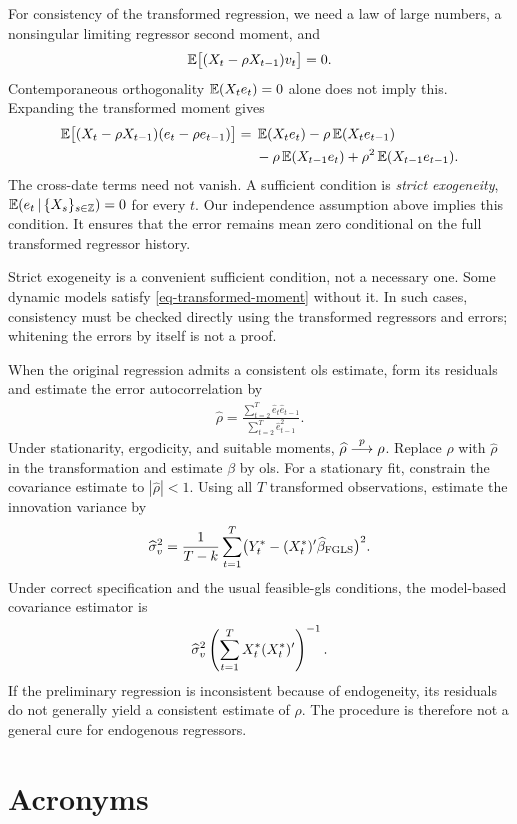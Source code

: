 \documentclass[a4paper,12pt]{article}
\begin{document}
\begin{remark}
	For consistency of the transformed regression, we need a law of large numbers,
	a nonsingular limiting regressor second moment, and
	\begin{align}\label{eq-transformed-moment}
		\operatorname{\mathbb{E}}\bigl[(X_t-\rho X_{t-1})v_t\bigr]=0.
	\end{align}
	Contemporaneous orthogonality $\operatorname{\mathbb{E}}(X_te_t)=0$ alone does not imply this.
	Expanding the transformed moment gives
	\begin{align}
		\operatorname{\mathbb{E}}\bigl[(X_t-\rho X_{t-1})(e_t-\rho e_{t-1})\bigr]
		={}&\operatorname{\mathbb{E}}(X_te_t)-\rho\operatorname{\mathbb{E}}(X_te_{t-1})\\
		&-\rho\operatorname{\mathbb{E}}(X_{t-1}e_t)+\rho^2\operatorname{\mathbb{E}}(X_{t-1}e_{t-1}).
	\end{align}
	The cross-date terms need not vanish.
	A sufficient condition is \emph{strict exogeneity},
	$\operatorname{\mathbb{E}}(e_t\mathpunct{}|\mathpunct{}\{X_s\}_{s\in\mathbb Z})=0$ for every $t$.
	Our independence assumption above implies this condition.
	It ensures that the error remains mean zero conditional on the full transformed regressor history.
\end{remark}

\begin{remark}
    Strict exogeneity is a convenient sufficient condition, not a necessary one.
    Some dynamic models satisfy \eqref{eq-transformed-moment} without it.
    In such cases, consistency must be checked directly using the transformed regressors and errors;
    whitening the errors by itself is not a proof.
\end{remark}

\begin{remark}
	When the original regression admits a consistent \gls{ols} estimate, form its residuals
	and estimate the error autocorrelation by
	\begin{align}
		\widehat\rho
		=\frac{\sum_{t=2}^T\widehat e_t\widehat e_{t-1}}
		{\sum_{t=2}^T\widehat e_{t-1}^2}.
	\end{align}
	Under stationarity, ergodicity, and suitable moments, $\widehat\rho\overset{p}{\longrightarrow}\rho$.
	Replace $\rho$ with $\widehat\rho$ in the transformation and estimate $\beta$ by \gls{ols}.
	For a stationary fit, constrain the covariance estimate to $|\widehat\rho|<1$.
	Using all $T$ transformed observations, estimate the innovation variance by
	\begin{align}
		\widehat\sigma_v^2
		=\frac{1}{T-k}\sum_{t=1}^T
		\bigl(Y_t^*-(X_t^*)^{\prime}\widehat\beta_{\mathrm{FGLS}}\bigr)^2.
	\end{align}
	Under correct specification and the usual feasible-\gls{gls} conditions,
	the model-based covariance estimator is
	\begin{align}
		\widehat\sigma_v^2
		\left(\sum_{t=1}^T X_t^*(X_t^*)^{\prime}\right)^{-1}.
	\end{align}
	If the preliminary regression is inconsistent because of endogeneity,
	its residuals do not generally yield a consistent estimate of $\rho$.
	The procedure is therefore not a general cure for endogenous regressors.
\end{remark}

\vfill
\section*{Acronyms}
\printglossaries
\end{document}
